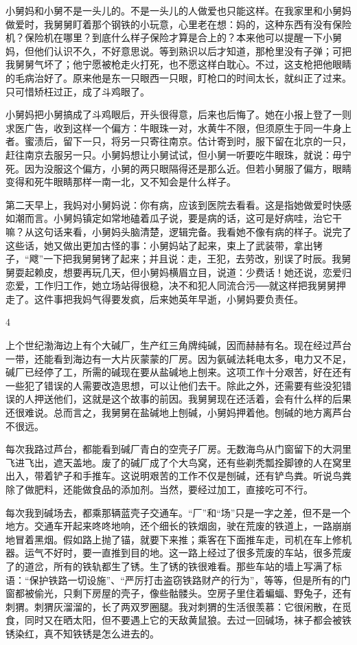 小舅妈和小舅不是一头儿的。不是一头儿的人做爱也只能这样。在我家里和小舅妈做爱时，我舅舅盯着那个钢铁的小玩意，心里老在想：妈的，这种东西有没有保险机？保险机在哪里？到底什么样子保险才算是合上的？本来他可以提醒一下小舅妈，但他们认识不久，不好意思说。等到熟识以后才知道，那枪里没有子弹；可把我舅舅气坏了；他宁愿被枪走火打死，也不愿这样白耽心。不过，这支枪把他眼睛的毛病治好了。原来他是东一只眼西一只眼，盯枪口的时间太长，就纠正了过来。只可惜矫枉过正，成了斗鸡眼了。 

小舅妈把小舅搞成了斗鸡眼后，开头很得意，后来也后悔了。她在小报上登了一则求医广告，收到这样一个偏方：牛眼珠一对，水黄牛不限，但须原生于同一牛身上者。蜜渍后，留下一只，将另一只寄往南京。估计寄到时，服下留在北京的一只，赶往南京去服另一只。小舅妈想让小舅试试，但小舅一听要吃牛眼珠，就说：毋宁死。因为没服这个偏方，小舅的两只眼隔得还是那么近。但若小舅服了偏方，眼睛变得和死牛眼睛那样一南一北，又不知会是什么样子。 

第二天早上，我妈对小舅妈说：你有病，应该到医院去看看。这是指她做爱时快感如潮而言。小舅妈镇定如常地磕着瓜子说，要是病的话，这可是好病哇，治它干嘛？从这句话来看，小舅妈头脑清楚，逻辑完备。我看她不像有病的样子。说完了这些话，她又做出更加古怪的事：小舅妈站了起来，束上了武装带，拿出铐子，“飕”一下把我舅舅铐了起来；并且说：走，王犯，去劳改，别误了时辰。我舅舅耍起赖皮，想要再玩几天，但小舅妈横眉立目，说道：少费话！她还说，恋爱归恋爱，工作归工作，她立场站得很稳，决不和犯人同流合污──就这样把我舅舅押走了。这件事把我妈气得要发疯，后来她英年早逝，小舅妈要负责任。


4 

上个世纪渤海边上有个大碱厂，生产红三角牌纯碱，因而赫赫有名。现在经过芦台一带，还能看到海边有一大片灰蒙蒙的厂房。因为氨碱法耗电太多，电力又不足，碱厂已经停了工，所需的碱现在要从盐碱地上刨来。这项工作十分艰苦，好在还有一些犯了错误的人需要改造思想，可以让他们去干。除此之外，还需要有些没犯错误的人押送他们，这就是这个故事的前因。我舅舅现在还活着，会有什么样的后果还很难说。总而言之，我舅舅在盐碱地上刨碱，小舅妈押着他。刨碱的地方离芦台不很远。 

每次我路过芦台，都能看到碱厂青白的空壳子厂房。无数海鸟从门窗留下的大洞里飞进飞出，遮天盖地。废了的碱厂成了个大鸟窝，还有些剃秃瓢拴脚镣的人在窝里出入，带着铲子和手推车。这说明艰苦的工作不仅是刨碱，还有铲鸟粪。听说鸟粪除了做肥料，还能做食品的添加剂。当然，要经过加工，直接吃可不行。 

每次我到碱场去，都乘那辆蓝壳子交通车。“厂”和“场”只是一字之差，但不是一个地方。交通车开起来咚咚地响，还个细长的铁烟囱，驶在荒废的铁道上，一路崩崩地冒着黑烟。假如路上抛了锚，就要下来推；乘客在下面推车走，司机在车上修机器。运气不好时，要一直推到目的地。这一路上经过了很多荒废的车站，很多荒废了的道岔，所有的铁轨都生了锈。生了锈的铁很难看。那些车站的墙上写满了标语：“保护铁路一切设施”、“严厉打击盗窃铁路财产的行为”，等等，但是所有的门窗都被偷光，只剩下房屋的壳子，像些骷髅头。空房子里住着蝙蝠、野兔子，还有刺猬。刺猬灰溜溜的，长了两双罗圈腿。我对刺猬的生活很羡慕：它很闲散，在觅食，同时又在晒太阳，但不要遇上它的天敌黄鼠狼。去过一回碱场，袜子都会被铁锈染红，真不知铁锈是怎么进去的。 

